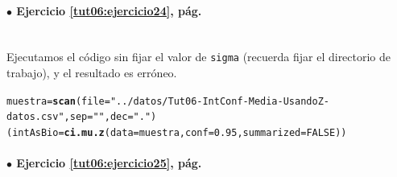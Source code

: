 \documentclass[10pt,a4paper]{article}\usepackage[]{graphicx}\usepackage[]{color}
\makeatletter
\newcommand{\hlnum}[1]{\textcolor[rgb]{0.686,0.059,0.569}{#1}}%
\newcommand{\hlstr}[1]{\textcolor[rgb]{0.192,0.494,0.8}{#1}}%
\newcommand{\hlstd}[1]{\textcolor[rgb]{0.345,0.345,0.345}{#1}}%
\newcommand{\hlkwb}[1]{\textcolor[rgb]{0.69,0.353,0.396}{#1}}%
\newcommand{\hlkwc}[1]{\textcolor[rgb]{0.333,0.667,0.333}{#1}}%
\newcommand{\hlkwd}[1]{\textcolor[rgb]{0.737,0.353,0.396}{\textbf{#1}}}%
\newenvironment{kframe}{%
 \def\at@end@of@kframe{}%
 \ifinner\ifhmode%
  \def\at@end@of@kframe{\end{minipage}}%
  \begin{minipage}{\columnwidth}%
 \fi\fi%
 \def\FrameCommand##1{\hskip\@totalleftmargin \hskip-\fboxsep
 \colorbox{shadecolor}{##1}\hskip-\fboxsep
     \hskip-\linewidth \hskip-\@totalleftmargin \hskip\columnwidth}%
 \MakeFramed {\advance\hsize-\width
   \@totalleftmargin\z@ \linewidth\hsize
   \@setminipage}}%
 {\par\unskip\endMakeFramed%
 \at@end@of@kframe}
\newenvironment{knitrout}{}{} %
\newcounter {cont01}
\makeatother
\begin{document}
\paragraph{\bf $\bullet$ Ejercicio \ref{tut06:ejercicio24}, pág. \pageref{tut06:ejercicio24}}
\label{tut06:ejercicio24:sol}\quad\\
Ejecutamos el código sin fijar el valor de {\tt sigma} (recuerda fijar el directorio de trabajo), y el resultado es erróneo.
\begin{knitrout}
\color{fgcolor}\begin{kframe}
\begin{alltt}
\hlstd{muestra} \hlkwb{=} \hlkwd{scan}\hlstd{(}\hlkwc{file}\hlstd{=}\hlstr{"../datos/Tut06-IntConf-Media-UsandoZ-datos.csv"}\hlstd{,} \hlkwc{sep}\hlstd{=}\hlstr{" "}\hlstd{,} \hlkwc{dec}\hlstd{=}\hlstr{"."}\hlstd{)}
\hlstd{(intAsBio} \hlkwb{=} \hlkwd{ci.mu.z}\hlstd{(}\hlkwc{data}\hlstd{=muestra,} \hlkwc{conf}\hlstd{=}\hlnum{0.95}\hlstd{,} \hlkwc{summarized}\hlstd{=}\hlnum{FALSE}\hlstd{))}
\end{alltt}


{\ttfamily\noindent\bfseries{}}\end{kframe}
\end{knitrout}


\paragraph{\bf $\bullet$ Ejercicio \ref{tut06:ejercicio25}, pág. \pageref{tut06:ejercicio25}}
\label{tut06:ejercicio25:sol}\quad\\
\end{document}
